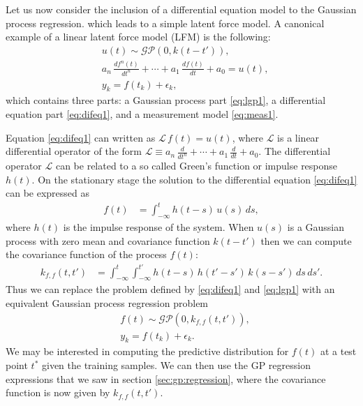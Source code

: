 \documentclass[journal]{IEEEtran}
\newcommand{\simo}[1]{{\color{red}#1}}
\begin{document}
Let us now consider the inclusion of a differential equation model to the Gaussian process regression. which leads to a simple latent force model. A canonical example of a linear latent force model (LFM) \cite{Alvarez+Luengo+Lawrence:2009,Alvarez+Luengo+Lawrence:2013} is the following:
%
\begin{eqnarray}
  &u(t) \sim \mathcal{GP}(0,k(t - t')), \label{eq:lgp1} \\
  &a_n \, \frac{df^{n}(t)}{dt^{n}} + \cdots
  + a_1 \, \frac{df(t)}{dt} + a_0 = u(t), \label{eq:difeq1} \\
  &y_k = f(t_k) + \epsilon_k, \label{eq:meas1}
\end{eqnarray}
%
which contains three parts: a Gaussian process part \eqref{eq:lgp1}, a differential equation part \eqref{eq:difeq1}, and a measurement model \eqref{eq:meas1}. 

Equation \eqref{eq:difeq1} can written as $\mathcal{L} \, f(t)=u(t)$, where $\mathcal{L}$ is a linear
differential operator of the form $\mathcal{L}\equiv a_n \, \frac{d}{dt^{n}} + \cdots
  + a_1 \, \frac{d}{dt} + a_0$. The differential operator $\mathcal{L}$ can be related to a so called Green's function or
impulse response $h(t)$.
On the stationary stage the solution to the differential equation \eqref{eq:difeq1} can be expressed as
%
\begin{equation}
\begin{split}
  f(t) &= \int_{-\infty}^{t} h(t - s) \, u(s) \, ds,
\end{split}
\end{equation}
%
where $h(t)$ is the impulse response of the system. When $u(s)$ is a Gaussian process with zero mean and covariance function $k(t - t')$ then we can compute the covariance function of the process $f(t)$:
%
\begin{equation}
\begin{split}
  k_{f,f}(t, t') &=
  \int_{-\infty}^{t} \int_{-\infty}^{t'}
  h(t - s) \, h(t' - s') \, k(s - s') \, ds \, ds'.
\end{split}
\label{eq:fcov}
\end{equation}
%
Thus we can replace the problem defined by \eqref{eq:difeq1} and \eqref{eq:lgp1} with an equivalent Gaussian process regression problem
%
\begin{eqnarray}
  &f(t) \sim \mathcal{GP}(0,k_{f, f}(t, t')), \label{eq:lgp2} \\
  &y_k = f(t_k) + \epsilon_k. \label{eq:meas2}
\end{eqnarray}
%
We may be interested in computing the predictive distribution for $f(t)$ at a test point $t^*$ given the training samples.
We can then use the GP regression expressions that we saw in section \ref{sec:gp:regression}, where the covariance
function is now given by $k_{f,f}(t,t')$.
\end{document}
